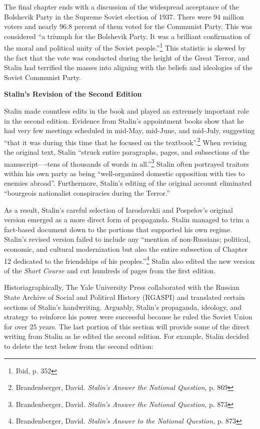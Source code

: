\documentclass[a4paper, twocolumn]{article}
\begin{document}
The final chapter ends with a discussion of the widespread acceptance
of the Bolshevik Party in the Supreme Soviet election of 1937. There
were 94 million voters and nearly 96.8 percent of them voted for the
Communist Party. This was considered ``a triumph for the Bolshevik
Party. It was a brilliant confirmation of the moral and political
unity of the Soviet people.''\footnote{Ibid, p. 352} This statistic is skewed by the fact
that the vote was conducted during the height of the Great Terror, and
Stalin had terrified the masses into aligning with the beliefs and
ideologies of the Soviet Communist
Party.


\begin{center}\textbf{Stalin's Revision of the Second Edition}\end{center}

	Stalin made countless edits in the book and played an extremely
    important role in the second edition. Evidence from Stalin's
    appointment books show that he had very few meetings scheduled in
    mid-May, mid-June, and mid-July, suggesting ``that it was during
    this time that he focused on the textbook''.\footnote{Brandenberger, David. \emph{Stalin's Answer the National Question}, p. 869} When revising the
    original text, Stalin ``struck entire paragraphs, pages, and
    subsections of the manuscript—-tens of thousands of words in
    all.''\footnote{Brandenberger, David. \emph{Stalin's Answer the National Question}, p. 873} Stalin often portrayed traitors within his own party as
    being ``well-organized domestic opposition with ties to enemies
    abroad''. Furthermore, Stalin's editing of the original account
    eliminated ``bourgeois nationalist conspiracies during the 
    Terror.''

As a result, Stalin's careful selection of Iaroslavskii and Pospelov's
original version emerged as a more direct form of propaganda. Stalin
managed to trim a fact-based document down to the portions
that supported his own regime. Stalin's revised version failed to
include any ``mention of non-Russians; political, economic, and
cultural modernization but also the entire subsection of Chapter 12
dedicated to the friendships of his peoples.''\footnote{Brandenberger, David. \emph{Stalin's Answer to the National Question}, p. 873}  Stalin also edited
the new version of the \emph{Short Course} and cut hundreds of pages from the
first edition.

Historiagraphically, The Yale University Press collaborated with the Russian State Archive
of Social and Political History (RGASPI) and translated certain
sections of Stalin's handwriting. Arguably, Stalin's propaganda,
ideology, and strategy to reinforce his power were successful because
he ruled the Soviet Union for over 25 years. The last portion of this
section will provide some of the direct writing from Stalin as he
edited the second edition. For example, Stalin decided to delete the
text below from the second edition:
\end{document}
